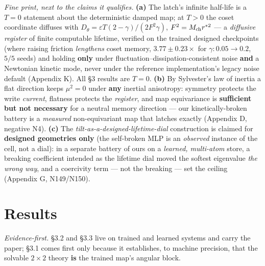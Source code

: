 \documentclass[10pt]{article}
\begin{document}
\emph{Fine print, next to the claims it qualifies.} \textbf{(a)} The latch's infinite half-life is a \textbf{$T=0$} statement about the deterministic damped map; at $T>0$ the coset coordinate diffuses with $D_\theta=\varepsilon T(2-\gamma)/(2F^2\gamma)$, $F^2=M_{\rm ch}r^{*2}$ --- a \emph{diffusive register} of finite computable lifetime, verified on the trained designed checkpoints (where raising friction \emph{lengthens} coset memory, $3.77\pm0.23\times$ for $\gamma:0.05\to0.2$, $5/5$ seeds) and holding \textbf{only} under fluctuation--dissipation-consistent noise \textbf{and} a Newtonian kinetic mode, never under the reference implementation's legacy noise default (Appendix K). All \S3 results are $T=0$. \textbf{(b)} By Sylvester's law of inertia a flat direction keeps $\mu^2=0$ under \textbf{any} inertial anisotropy: symmetry protects the write \emph{current}, flatness protects the \emph{register}, and map equivariance is \textbf{sufficient but not necessary} for a neutral memory direction --- our kinetically-broken battery is a \emph{measured} non-equivariant map that latches exactly (Appendix D, negative N4). \textbf{(c)} The \emph{tilt-as-a-designed-lifetime-dial} construction is claimed for \textbf{designed geometries only} (the self-broken MLP is an \emph{observed} instance of the cell, not a dial): in a separate battery of ours on a \emph{learned, multi-atom} store, a breaking coefficient intended as the lifetime dial moved the softest eigenvalue \emph{the wrong way}, and a coercivity term --- not the breaking --- set the ceiling (Appendix G, N149/N150).


\section{Results}

\emph{Evidence-first.} \S3.2 and \S3.3 live on trained and learned systems and carry the paper; \S3.1 comes first only because it establishes, to machine precision, that the solvable $2\times2$ theory \textbf{is} the trained map's angular block.
\end{document}
